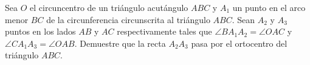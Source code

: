 Sea $O$ el circuncentro de un triángulo acutángulo $ABC$ y $A_1$ un punto en el arco menor $BC$ de la circunferencia circunscrita al triángulo $ABC$. Sean $A_2$ y $A_3$ puntos en los lados $AB$ y $AC$ respectivamente tales que $\angle B A_1 A_2 = \angle OAC$ y $\angle C A_1 A_3 = \angle OAB$. Demuestre que la recta $A_2 A_3$ pasa por el ortocentro del triángulo $ABC$.
